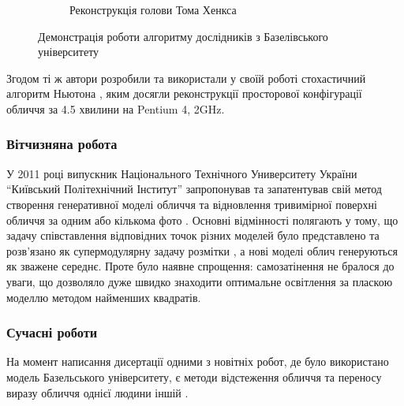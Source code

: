 \begin{figure}[h]
\begin{subfigure}[b]{0.3\textwidth}
    \caption{Реконструкція голови Тома Хенкса}
    \label{fig:bfm:tom-hanks}
  \end{subfigure}
  \caption{Демонстрація роботи алгоритму дослідників з Базелівського університету}
\end{figure}

Згодом ті ж автори розробили та використали у своїй роботі
стохастичний алгоритм Ньютона \cite{blanz:vetter:2003},
яким досягли реконструкції просторової конфігурації обличчя за 4.5 хвилини на
Pentium 4, 2GHz.

\subsubsection{Вітчизняна робота}

У 2011 році випускник Національного Технічного Университету України
``Київський Політехнічний Інститут'' запропонував та запатентував
свій метод створення генеративної моделі обличчя та відновлення
тривимірної поверхні обличчя за одним або кількома фото \cite{tyshchenko:2011}.
Основні відмінності полягають у тому,
що задачу співставлення відповідних точок різних моделей
було представлено та розв'язано як супермодулярну задачу розмітки
\cite{Rossi:2006:HCP:1207782},
а нові моделі облич генеруються як зважене середнє.
Проте було наявне спрощення: самозатінення не бралося до уваги,
що дозволяло дуже швидко знаходити оптимальне освітлення
за пласкою моделлю методом найменших квадратів.

\subsubsection{Сучасні роботи}

На момент написання дисертації одними з новітніх робот,
де було використано модель Базельського університету,
є методи відстеження обличчя \cite{Saito2016}
та переносу виразу обличчя однієї людини іншій \cite{thies2016face}.
